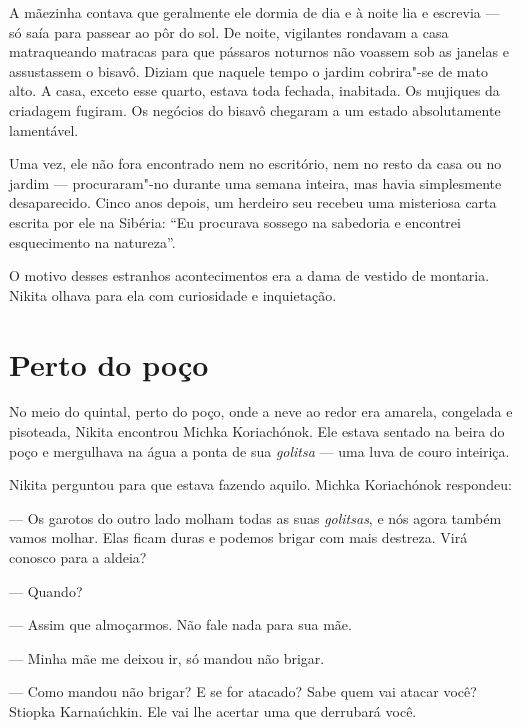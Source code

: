 A mãezinha contava que geralmente ele dormia de dia e à noite lia e
escrevia --- só saía para passear ao pôr do sol. De noite, vigilantes
rondavam a casa matraqueando matracas para que pássaros noturnos não
voassem sob as janelas e assustassem o bisavô. Diziam que naquele tempo o
jardim cobrira"-se de mato alto. A casa, exceto esse quarto, estava toda
fechada, inabitada. Os mujiques da criadagem fugiram. Os negócios do
bisavô chegaram a um estado absolutamente lamentável.

Uma vez, ele não fora encontrado nem no escritório, nem no resto da casa
ou no jardim --- procuraram"-no durante uma semana inteira, mas havia
simplesmente desaparecido. Cinco anos depois, um herdeiro seu recebeu
uma misteriosa carta escrita por ele na Sibéria: ``Eu procurava sossego
na sabedoria e encontrei esquecimento na natureza''.

O motivo desses estranhos acontecimentos era a dama de vestido de
montaria. Nikita olhava para ela com curiosidade e inquietação.


\chapter{Perto do poço}

No meio do quintal, perto do poço, onde a neve ao redor era amarela,
congelada e pisoteada, Nikita encontrou Michka Koriachónok. Ele
estava sentado na beira do poço e mergulhava na água a ponta de sua
\emph{golitsa} --- uma luva de couro inteiriça.

Nikita perguntou para que estava fazendo aquilo. Michka Koriachónok
respondeu:

--- Os garotos do outro lado molham todas as suas \emph{golitsas}, e nós
agora também vamos molhar. Elas ficam duras e podemos brigar com mais
destreza. Virá conosco para a aldeia?

--- Quando?

--- Assim que almoçarmos. Não fale nada para sua mãe.

--- Minha mãe me deixou ir, só mandou não brigar.

--- Como mandou não brigar? E se for atacado? Sabe quem vai atacar você?
Stiopka Karnaúchkin. Ele vai lhe acertar uma que derrubará você.


